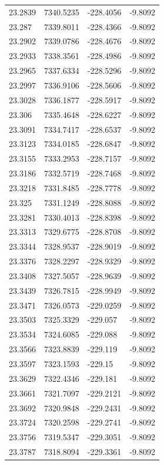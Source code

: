 \begin{table}[H]
\begin{tabular}{llll}
23.2839 & 7340.5235 & -228.4056 & -9.8092 \\
23.287 & 7339.8011 & -228.4366 & -9.8092 \\
23.2902 & 7339.0786 & -228.4676 & -9.8092 \\
23.2933 & 7338.3561 & -228.4986 & -9.8092 \\
23.2965 & 7337.6334 & -228.5296 & -9.8092 \\
23.2997 & 7336.9106 & -228.5606 & -9.8092 \\
23.3028 & 7336.1877 & -228.5917 & -9.8092 \\
23.306 & 7335.4648 & -228.6227 & -9.8092 \\
23.3091 & 7334.7417 & -228.6537 & -9.8092 \\
23.3123 & 7334.0185 & -228.6847 & -9.8092 \\
23.3155 & 7333.2953 & -228.7157 & -9.8092 \\
23.3186 & 7332.5719 & -228.7468 & -9.8092 \\
23.3218 & 7331.8485 & -228.7778 & -9.8092 \\
23.325 & 7331.1249 & -228.8088 & -9.8092 \\
23.3281 & 7330.4013 & -228.8398 & -9.8092 \\
23.3313 & 7329.6775 & -228.8708 & -9.8092 \\
23.3344 & 7328.9537 & -228.9019 & -9.8092 \\
23.3376 & 7328.2297 & -228.9329 & -9.8092 \\
23.3408 & 7327.5057 & -228.9639 & -9.8092 \\
23.3439 & 7326.7815 & -228.9949 & -9.8092 \\
23.3471 & 7326.0573 & -229.0259 & -9.8092 \\
23.3503 & 7325.3329 & -229.057 & -9.8092 \\
23.3534 & 7324.6085 & -229.088 & -9.8092 \\
23.3566 & 7323.8839 & -229.119 & -9.8092 \\
23.3597 & 7323.1593 & -229.15 & -9.8092 \\
23.3629 & 7322.4346 & -229.181 & -9.8092 \\
23.3661 & 7321.7097 & -229.2121 & -9.8092 \\
23.3692 & 7320.9848 & -229.2431 & -9.8092 \\
23.3724 & 7320.2598 & -229.2741 & -9.8092 \\
23.3756 & 7319.5347 & -229.3051 & -9.8092 \\
23.3787 & 7318.8094 & -229.3361 & -9.8092 \\

\end{tabular}
\end{table}

